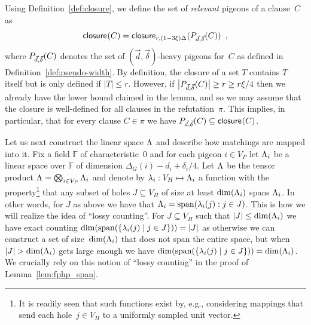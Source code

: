 \documentclass{theoretics}
\newcommand{\set}[1]{\{ #1 \}}
\newcommand{\setdescr}[3][\mid]{\set{ #2 #1 #3 }}
\newcommand{\Setsize}[1]{\bigl\lvert#1\bigr\rvert}
\newcommand{\setsize}[1]{\lvert#1\rvert}
\newcommand{\introduceterm}[1]{{\emph{#1}}}
\newcommand{\eqcomma}{\enspace ,}
\newcommand{\reflem}[1]{Lemma~\ref{#1}}
\newcommand{\refdef}[1]{Definition~\ref{#1}}
\newcommand{\refpi}{\pi}
\newcommand{\heavy}{heavy\xspace}
\renewcommand{\deg}[2][XXXXXXXXXXXX]{\Delta_{#1}(#2)}
\newcommand{\diff}{\xi}
\newcommand{\dimLi}{\deg[G]{i} - d_i + \delta_i/4}
\newcommand{\GdegMax}{\Delta}
\newcommand{\gdegmax}{\GdegMax}
\newcommand{\V}[1][]{V_{#1}}
\newcommand{\Vp}{\V[P]}
\newcommand{\Vh}{\V[H]}
\newcommand{\vecthr}{\vec{d}}
\newcommand{\vecadv}{\vec{\delta}}
\newcommand{\Pthick}[1]{\ensuremath P_{\vecthr,\vecadv}(#1)}
\newcommand{\linspace}[1][]{\ensuremath \Lambda_{{#1}}}
\newcommand{\linmap}[1][]{\ensuremath \lambda_{{#1}}}
\newcommand{\linmapof}[2][]{\linmap[#1](#2)}
\newcommand{\closure}[2][]{\mathsf{closure}_{{#1}}(#2)}
\newcommand{\spans}[1]{\mathrm{span} ( #1 )}
\newcommand{\bigtensor}{\ensuremath \bigotimes}
\numberwithin{equation}{section}
\begin{document}
\lemmafphplower*

Using \refdef{def:closure}, we define the set of
\introduceterm{relevant} pigeons of a clause~$C$ as
\begin{equation}
  \closure{C} = \closure[r, (1 - 3\diff)\gdegmax]{\Pthick{C}} 
  \eqcomma
\end{equation}
where 
$\Pthick{C} $
denotes the set of
$(\vecthr, \vecadv)$-\heavy pigeons for~$C$ as defined in
\refdef{def:pseudo-width}.
By definition,
the closure of a set $T$ contains $T$ itself 
but is only defined if $\setsize{T} \le r$.
However, if $ \Setsize{\Pthick{C}} \geq r \geq r \diff/4 $ then we
already have the lower bound claimed in the lemma, and so we may
assume that the closure is well-defined for all clauses in the
refutation~$\refpi$.  This implies, in particular, that for every
clause $C \in \refpi$ we have $\Pthick{C} \subseteq \closure{C}$.

Let us next construct the linear space $\linspace$ and describe how
matchings are mapped into it.  Fix a field $\mathbb{F}$ of characteristic~$0$ and for each pigeon
$i \in \Vp$ let $\linspace[i]$ be a linear space over $\mathbb{F}$ of
dimension $\dimLi$. Let $\linspace$ be the tensor product
$\linspace = \bigtensor_{i \in \Vp} \linspace[i]$ and denote by
$\linmap[i]: \Vh \mapsto \linspace[i]$ a function with the
property\footnote{It is readily seen that such functions exist by,
  e.g., considering mappings that send each hole~$j \in \Vh$ to a
  uniformly sampled unit vector.} that any subset of holes
$J \subseteq \Vh$ of size at least $\dim(\linspace[i])$ spans
$\linspace[i]$. In other words, for $J$ as above
we have that $\linspace[i] = \spans{\linmapof[i]{j}:j\in J}$.
This is how we will realize the idea of ``lossy counting''. For
$J \subseteq \Vh$ such that $\setsize{J} \le \dim(\linspace[i])$ we
have exact counting
$ \dim(\spans{\setdescr{\linmap[i](j)}{j \in J}}) = \setsize{J} $ as
otherwise we can construct a set of size~$\dim(\linspace[i])$ that
does not span the entire space, but
when $ \setsize{J} > \dim(\linspace[i]) $ gets large enough we have
$ \dim(\spans{\setdescr{\linmap[i](j)}{j \in J}}) = \dim(\linspace[i])
$. We crucially rely on this notion of ``lossy counting'' in the proof
of \reflem{lem:fphp_span}.
\end{document}
